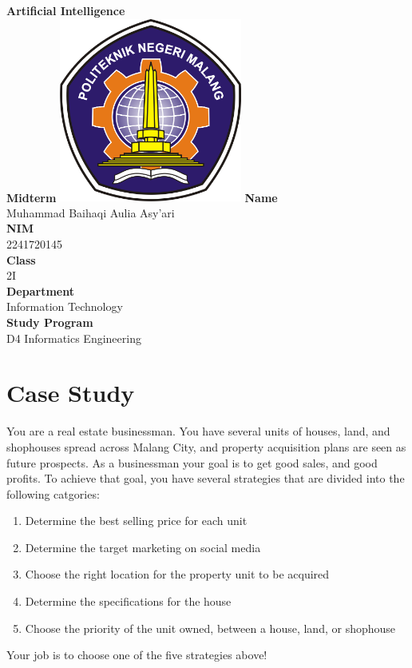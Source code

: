 \documentclass[12pt,titlepage]{article}
\newcommand{\vSubject}{Artificial Intelligence}
\newcommand{\vSubtitle}{Midterm}
\newcommand{\vName}{Muhammad Baihaqi Aulia Asy'ari}
\newcommand{\vNIM}{2241720145}
\newcommand{\vClass}{2I}
\newcommand{\vDepartment}{Information Technology}
\newcommand{\vStudyProgram}{D4 Informatics Engineering}
\begin{document}
\begin{titlepage}
    \centering
    \vfill
    {\bfseries\LARGE
        \vSubject\\
        \vskip0.25cm
        \vSubtitle
    }
    \vfill
    \includegraphics[width=6cm]{images/polinema-logo.png}
    \vfill
    {
        \textbf{Name}\\
        \vName\\
        \vskip0.5cm
        \textbf{NIM}\\
        \vNIM\\
        \vskip0.5cm
        \textbf{Class}\\
        \vClass\\
        \vskip0.5cm
        \textbf{Department}\\
        \vDepartment\\
        \vskip0.5cm
        \textbf{Study Program}\\
        \vStudyProgram
    }
\end{titlepage}

\newpage

\section*{Case Study}
\noindent
You are a real estate businessman. You have several units of houses, land, and shophouses spread across Malang City, and property acquisition plans are seen as future prospects. As a businessman your goal is to get good sales, and good profits.
To achieve that goal, you have several strategies that are divided into the following catgories:
\begin{enumerate}
    \item Determine the best selling price for each unit
    \item Determine the target marketing on social media
    \item Choose the right location for the property unit to be acquired
    \item Determine the specifications for the house
    \item Choose the priority of the unit owned, between a house, land, or shophouse
\end{enumerate}
Your job is to choose one of the five strategies above!
\end{document}
